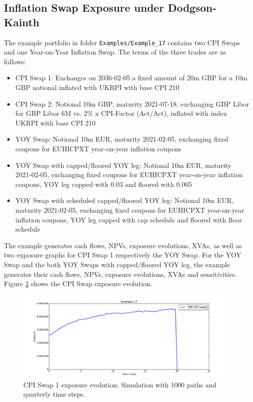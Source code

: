 \documentclass[12pt, a4paper]{article}
\begin{document}
\subsection{Inflation Swap Exposure under Dodgson-Kainth}%
\label{example:17}

The example portfolio in folder {\tt Examples/Example\_17} contains two CPI Swaps and one Year-on-Year Inflation Swap.
The terms of the three trades are as follows:

\begin{itemize}
\item CPI Swap 1: Exchanges on 2036-02-05 a fixed amount of 20m GBP for a 10m GBP notional inflated with UKRPI with base CPI 210
\item CPI Swap 2: Notional 10m GBP, maturity 2021-07-18, exchanging GBP Libor for GBP Libor 6M vs. $2\%$ x CPI-Factor (Act/Act), inflated with index UKRPI with base CPI 210
\item YOY Swap: Notional 10m EUR, maturity 2021-02-05, exchanging fixed coupons for EUHICPXT year-on-year inflation coupons
\item YOY Swap with capped/floored YOY leg: Notional 10m EUR, maturity 2021-02-05, exchanging fixed coupons for EUHICPXT year-on-year inflation coupons, YOY leg capped with 0.03 and floored with 0.005
\item YOY Swap with scheduled capped/floored YOY leg: Notional 10m EUR, maturity 2021-02-05, exchanging fixed coupons for EUHICPXT year-on-year inflation coupons, YOY leg capped with cap schedule and floored with floor schedule
\end{itemize}

The example generates cash flows, NPVs, exposure evolutions, XVAs, as well as two exposure graphs for CPI Swap 1 respectively the YOY Swap. For the YOY Swap and the both YOY Swaps with capped/floored YOY leg, the example generates their cash flows, NPVs, exposure evolutions, XVAs and sensitivities. Figure \ref{fig_cpi_swap} shows the CPI Swap exposure evolution.

\begin{figure}[h!]
	\begin{center}
		\includegraphics[scale=0.45]{mpl_cpi_swap.pdf}
	\end{center}
	\caption{CPI Swap 1 exposure evolution. Simulation with 1000 paths and quarterly time steps.}
	\label{fig_cpi_swap}
\end{figure}
\end{document}
